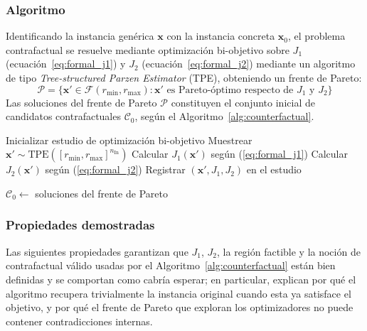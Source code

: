 \documentclass[12pt]{report} %
\begin{document}
\subsubsection{Algoritmo}

Identificando la instancia genérica $\mathbf{x}$ con la instancia concreta $\mathbf{x}_0$, el problema contrafactual se resuelve mediante optimización bi-objetivo sobre $J_1$ (ecuación~\eqref{eq:formal_j1}) y $J_2$ (ecuación~\eqref{eq:formal_j2}) mediante un algoritmo de tipo \textit{Tree-structured Parzen Estimator} (TPE), obteniendo un frente de Pareto:
$$\mathcal{P} = \{\mathbf{x}' \in \mathcal{F}(r_{\min}, r_{\max}) : \mathbf{x}' \text{ es Pareto-óptimo respecto de } J_1 \text{ y } J_2\}$$
Las soluciones del frente de Pareto $\mathcal{P}$ constituyen el conjunto inicial de candidatos contrafactuales $\mathcal{C}_0$, según el Algoritmo~\ref{alg:counterfactual}.

\begin{algorithm}[H]
    \caption{Generación de candidatos contrafactuales}
    \label{alg:counterfactual}
    Inicializar estudio de optimización bi-objetivo\;
    Muestrear $\mathbf{x}' \sim \text{TPE}([r_{\min}, r_{\max}]^{n_{\text{In}}})$\;
    Calcular $J_1(\mathbf{x}')$ según (\ref{eq:formal_j1})\;
    Calcular $J_2(\mathbf{x}')$ según (\ref{eq:formal_j2})\;
    Registrar $(\mathbf{x}', J_1, J_2)$ en el estudio\;

    $\mathcal{C}_0 \leftarrow$ soluciones del frente de Pareto\;
\end{algorithm}

\subsubsection{Propiedades demostradas}

Las siguientes propiedades garantizan que $J_1$, $J_2$, la región factible y la noción de contrafactual válido usadas por el Algoritmo~\ref{alg:counterfactual} están bien definidas y se comportan como cabría esperar; en particular, explican por qué el algoritmo recupera trivialmente la instancia original cuando esta ya satisface el objetivo, y por qué el frente de Pareto que exploran los optimizadores no puede contener contradicciones internas.
\end{document}
